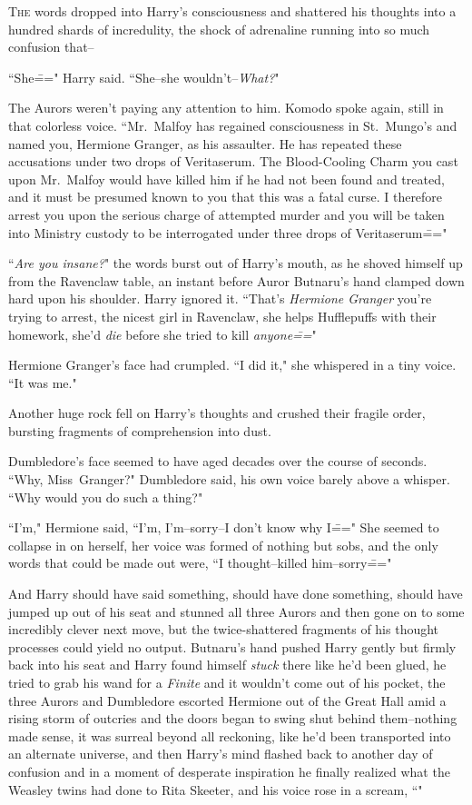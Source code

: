 
\lettrine{T}{he} words dropped into Harry's consciousness and shattered his thoughts into a hundred shards of incredulity, the shock of adrenaline running into so much confusion that\---

``She\===" Harry said. ``She\---she wouldn't\---\emph{What?}"

The Aurors weren't paying any attention to him. Komodo spoke again, still in that colorless voice. ``Mr.~Malfoy has regained consciousness in St.~Mungo's and named you, Hermione Granger, as his assaulter. He has repeated these accusations under two drops of Veritaserum. The Blood-Cooling Charm you cast upon Mr.~Malfoy would have killed him if he had not been found and treated, and it must be presumed known to you that this was a fatal curse. I therefore arrest you upon the serious charge of attempted murder and you will be taken into Ministry custody to be interrogated under three drops of Veritaserum\==="

``\emph{Are you insane?}" the words burst out of Harry's mouth, as he shoved himself up from the Ravenclaw table, an instant before Auror Butnaru's hand clamped down hard upon his shoulder. Harry ignored it. ``That's \emph{Hermione Granger} you're trying to arrest, the nicest girl in Ravenclaw, she helps Hufflepuffs with their homework, she'd \emph{die} before she tried to kill \emph{anyone\===}"

Hermione Granger's face had crumpled. ``I did it," she whispered in a tiny voice. ``It was me."

Another huge rock fell on Harry's thoughts and crushed their fragile order, bursting fragments of comprehension into dust.

Dumbledore's face seemed to have aged decades over the course of seconds. ``Why, Miss~Granger?" Dumbledore said, his own voice barely above a whisper. ``Why would you do such a thing?"

``I'm," Hermione said, ``I'm, I'm\---sorry\---I don't know why I\===" She seemed to collapse in on herself, her voice was formed of nothing but sobs, and the only words that could be made out were, ``I thought\---killed him\---sorry\==="

And Harry should have said something, should have done something, should have jumped up out of his seat and stunned all three Aurors and then gone on to some incredibly clever next move, but the twice-shattered fragments of his thought processes could yield no output. Butnaru's hand pushed Harry gently but firmly back into his seat and Harry found himself \emph{stuck} there like he'd been glued, he tried to grab his wand for a \emph{Finite} and it wouldn't come out of his pocket, the three Aurors and Dumbledore escorted Hermione out of the Great Hall amid a rising storm of outcries and the doors began to swing shut behind them\---nothing made sense, it was surreal beyond all reckoning, like he'd been transported into an alternate universe, and then Harry's mind flashed back to another day of confusion and in a moment of desperate inspiration he finally realized what the Weasley twins had done to Rita Skeeter, and his voice rose in a scream, ``"

